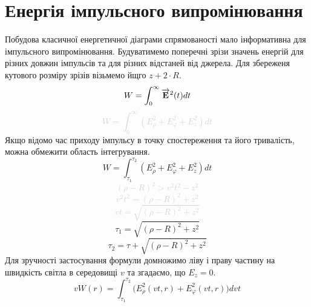 \section{Енергія імпульсного випромінювання}

Побудова класичної енергетичної діаграми спрямованості мало інформативна 
для імпульсного випромінювання. Будуватимемо поперечні зрізи значень енергій
для різних довжин імпульсів та для різних відстаней від джерела.
Для збереженя кутового розміру зрізів візьмемо йщго $ z + 2 \cdot R $.
%
\begin{equation}
W = \int_{0}^{\infty} \overrightarrow{\mathbf E}^2 (t) dt
\end{equation}
%
\textcolor{lightgray} { \begin{equation}
W = \int_{0}^{\infty} \left( E_\rho^2 + E_\varphi^2 + E_z^2 \right) dt
\end{equation} }
%
Якщо відомо час приходу імпульсу в точку спостереження та його тривалість, 
можна обмежити область інтегрування.
%
\begin{equation}
W = \int_{\tau_1}^{\tau_2} \left( E_\rho^2 + E_\varphi^2 + E_z^2 \right) dt
\end{equation}
%
\textcolor{lightgray} { \begin{equation*}
(\rho-R)^2 > v^2t^2 - z^2
\end{equation*} }
%
\textcolor{lightgray} { \begin{equation*}
v^2t^2 = (\rho-R)^2 + z^2
\end{equation*} }
%
\textcolor{lightgray} { \begin{equation*}
vt = \sqrt{(\rho-R)^2 + z^2}
\end{equation*} }
%
\begin{equation*}
\tau_1 = \sqrt{(\rho-R)^2 + z^2}
\end{equation*}
%
\begin{equation*}
\tau_2 = \tau + \sqrt{(\rho-R)^2 + z^2}
\end{equation*}
%
Для зручності застосування формули домножимо ліву і праву частину на
швидкість світла в середовищі $ v $ та згадаємо, що $ E_z = 0 $.
%
\begin{equation}
v W(r) = \int_{\tau_1}^{\tau_2} 
\Big( E_\rho^2 (vt,r) + E_\varphi^2 (vt,r) \Big) dvt
\end{equation}


